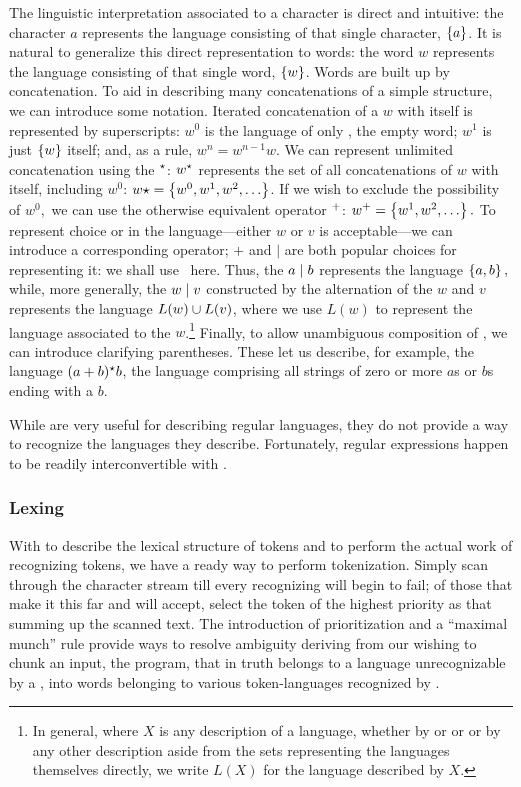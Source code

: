 The linguistic interpretation associated to a character is direct and intuitive: the character $a$ represents the language consisting of that single character, $\left\{ a \right\}$. It is natural to generalize this direct representation to words: the word $w$ represents the language consisting of that single word, $\left\{ w \right\}$. Words are built up by concatenation. To aid in describing many concatenations of a simple structure, we can introduce some notation. Iterated concatenation of a \regex $w$ with itself is represented by superscripts: $w^{0}$ is the language of only \emptyword, the empty word; $w^{1}$ is just $\left\{ w \right\}$ itself; and, as a rule, $w^{n} = w^{n-1}w$. We can represent unlimited concatenation using the  $^{\star}{}$: $w^{\star}{}$ represents the set of all concatenations of $w$ with itself, including $w^{0}$: $w\star = \set{w^{0}, w^{1}, w^{2}, \dotsc}$. If we wish to exclude the possibility of $w^{0},$ we can use the otherwise equivalent  operator $^{+}{}$: $w\posclos = \set{w^{1}, w^{2}, \dotsc}.$ To represent choice or  in the language---either \regex $w$ or \regex $v$ is acceptable---we can introduce a corresponding operator; $+$ and $\vert$ are both popular choices for representing it: we shall use \alt\ here. Thus, the \regex $a \mid b$ represents the language $\left\{ a, b \right\},$ while, more generally, the \regex $w \mid v$ constructed by the alternation of the \regexes $w$ and $v$ represents the language $L(w) \cup L(v)$, where we use $L(w)$ to represent the language associated to the \regex $w$.\footnote{In general, where $X$ is any description of a language, whether by \TM or \FA or \regex or by any other description aside from the sets representing the languages themselves directly, we write $L(X)$ for the language described by $X$.} Finally, to allow unambiguous composition of \regexes, we can introduce clarifying parentheses. These let us describe, for example, the language $(a + b)^{\star}{} b$, the language comprising all strings of zero or more $a$s or $b$s ending with a $b$.

While \regexes are very useful for describing regular languages, they do not provide a way to recognize the languages they describe. Fortunately, regular expressions happen to be readily interconvertible with \FAs.

\subsubsection{Lexing}
With \regexes to describe the lexical structure of tokens and \FAs to perform the actual work of recognizing tokens, we have a ready way to perform tokenization. Simply scan through the character stream till every recognizing \FA will begin to fail; of those that make it this far and will accept, select the token of the highest priority as that summing up the scanned text. The introduction of prioritization and a ``maximal munch'' rule provide ways to resolve ambiguity deriving from our wishing to chunk an input, the program, that in truth belongs to a language unrecognizable by a \FA{}, into words belonging to various token-languages recognized by \FAs.

